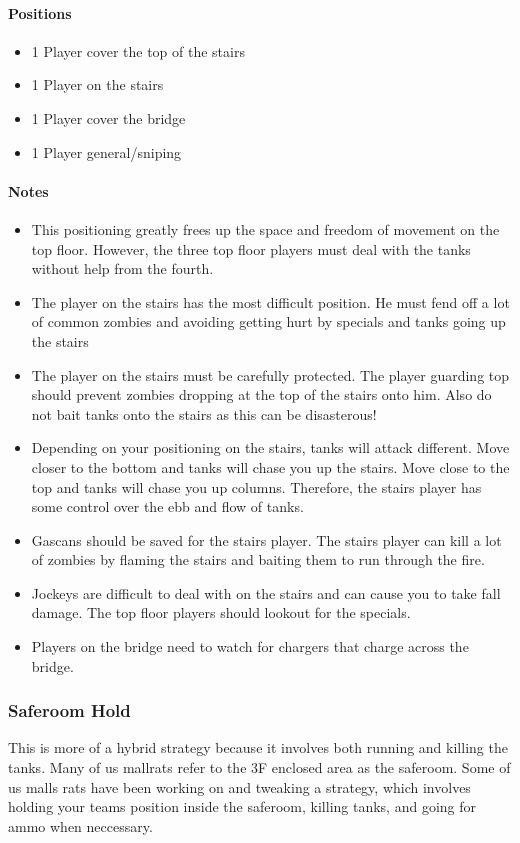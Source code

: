 \paragraph{Positions}
\begin{itemize}
\item 1 Player cover the top of the stairs
\item 1 Player on the stairs
\item 1 Player cover the bridge
\item 1 Player general/sniping
\end{itemize}

\paragraph{Notes}
\begin{itemize}
\item This positioning greatly frees up the space and freedom of movement on the top floor. However, the three top floor players must deal with the tanks without help from the fourth.
\item The player on the stairs has the most difficult position. He must fend off a lot of common zombies and avoiding getting hurt by specials and tanks going up the stairs
\item The player on the stairs must be carefully protected. The player guarding top should prevent zombies dropping at the top of the stairs onto him. Also do not bait tanks onto the stairs as this can be disasterous!
\item Depending on your positioning on the stairs, tanks will attack different. Move closer to the bottom and tanks will chase you up the stairs. Move close to the top and tanks will chase you up columns. Therefore, the stairs player has some control over the ebb and flow of tanks.
\item Gascans should be saved for the stairs player. The stairs player can kill a lot of zombies by flaming the stairs and baiting them to run through the fire.
\item Jockeys are difficult to deal with on the stairs and can cause you to take fall damage. The top floor players should lookout for the specials.
\item Players on the bridge need to watch for chargers that charge across the bridge.
\end{itemize}

\subsubsection{Saferoom Hold}
This is more of a hybrid strategy because it involves both running and killing the tanks. Many of us mallrats refer to the 3F enclosed area as the saferoom. Some of us malls rats have been working on and tweaking a strategy, which involves holding your teams position inside the saferoom, killing tanks, and going for ammo when neccessary.


